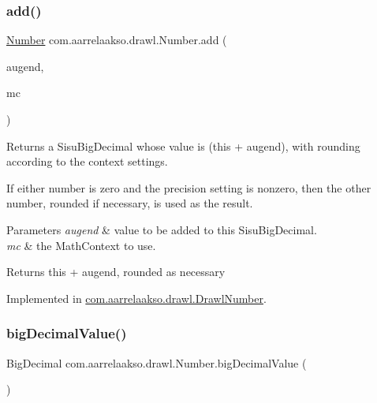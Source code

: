 \subsubsection{\texorpdfstring{add()}{add()}\hspace{0.1cm}{\footnotesize\ttfamily [3/3]}}
{\footnotesize\ttfamily \hyperlink{interfacecom_1_1aarrelaakso_1_1drawl_1_1_number}{Number} com.\+aarrelaakso.\+drawl.\+Number.\+add (\begin{DoxyParamCaption}\item[{@Not\+Null final \hyperlink{interfacecom_1_1aarrelaakso_1_1drawl_1_1_number}{Number}}]{augend,  }\item[{final Math\+Context}]{mc }\end{DoxyParamCaption})}



Returns a Sisu\+Big\+Decimal whose value is (this + augend), with rounding according to the context settings. 

If either number is zero and the precision setting is nonzero, then the other number, rounded if necessary, is used as the result.


\begin{DoxyParams}{Parameters}
{\em augend} & value to be added to this Sisu\+Big\+Decimal. \\
\hline
{\em mc} & the Math\+Context to use. \\
\hline
\end{DoxyParams}
\begin{DoxyReturn}{Returns}
this + augend, rounded as necessary 
\end{DoxyReturn}


Implemented in \hyperlink{classcom_1_1aarrelaakso_1_1drawl_1_1_drawl_number_a1ecd88ae492b29cf92013f7441f488f8}{com.\+aarrelaakso.\+drawl.\+Drawl\+Number}.

\mbox{\label{interfacecom_1_1aarrelaakso_1_1drawl_1_1_number_a88d32e8ed7137662dc845ac6937107e6}} 
\subsubsection{\texorpdfstring{big\+Decimal\+Value()}{bigDecimalValue()}}
{\footnotesize\ttfamily Big\+Decimal com.\+aarrelaakso.\+drawl.\+Number.\+big\+Decimal\+Value (\begin{DoxyParamCaption}{ }\end{DoxyParamCaption})}



